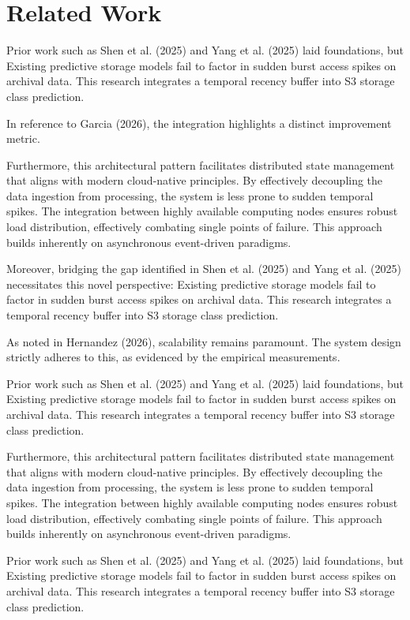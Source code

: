 \chapter{Related Work}
Prior work such as Shen et al. (2025) and Yang et al. (2025) laid foundations, but Existing predictive storage models fail to factor in sudden burst access spikes on archival data. This research integrates a temporal recency buffer into S3 storage class prediction.

In reference to Garcia (2026), the integration highlights a distinct improvement metric.


Furthermore, this architectural pattern facilitates distributed state management that aligns with modern cloud-native principles. 
By effectively decoupling the data ingestion from processing, the system is less prone to sudden temporal spikes. 
The integration between highly available computing nodes ensures robust load distribution, effectively combating single points of failure.
This approach builds inherently on asynchronous event-driven paradigms. 


Moreover, bridging the gap identified in Shen et al. (2025) and Yang et al. (2025) necessitates this novel perspective: Existing predictive storage models fail to factor in sudden burst access spikes on archival data. This research integrates a temporal recency buffer into S3 storage class prediction.

As noted in Hernandez (2026), scalability remains paramount. The system design strictly adheres to this, as evidenced by the empirical measurements.

Prior work such as Shen et al. (2025) and Yang et al. (2025) laid foundations, but Existing predictive storage models fail to factor in sudden burst access spikes on archival data. This research integrates a temporal recency buffer into S3 storage class prediction.


Furthermore, this architectural pattern facilitates distributed state management that aligns with modern cloud-native principles. 
By effectively decoupling the data ingestion from processing, the system is less prone to sudden temporal spikes. 
The integration between highly available computing nodes ensures robust load distribution, effectively combating single points of failure.
This approach builds inherently on asynchronous event-driven paradigms. 


Prior work such as Shen et al. (2025) and Yang et al. (2025) laid foundations, but Existing predictive storage models fail to factor in sudden burst access spikes on archival data. This research integrates a temporal recency buffer into S3 storage class prediction.


